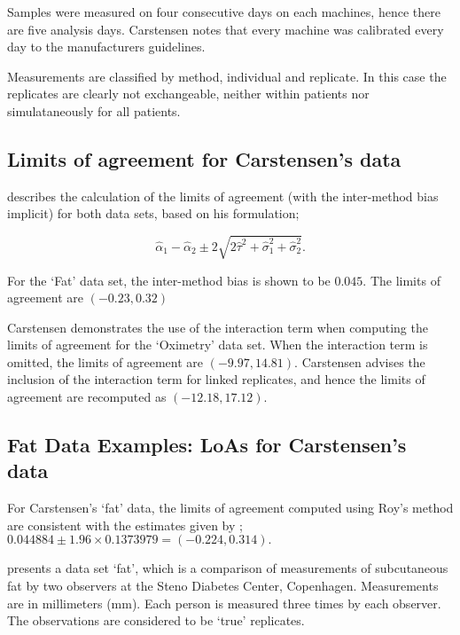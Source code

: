 \documentclass[12pt, a4paper]{report}
\theoremstyle{plain}
\theoremstyle{definition}
\theoremstyle{remark}
\begin{document}
	Samples were measured on four consecutive days on each machines, hence there are five analysis days. Carstensen notes that every machine was calibrated every day to  the manufacturers guidelines.

	Measurements are classified by method, individual and replicate. In this case the replicates are clearly not exchangeable, neither within patients nor simulataneously for all patients.

	\subsection{Limits of agreement for Carstensen's data}
	
	
	\citet{bxc2008} describes the calculation of the limits of agreement (with the inter-method bias implicit) for both data sets, based on his formulation;
	
	\[\hat{\alpha}_1 - \hat{\alpha}_2 \pm 2\sqrt{2\hat{\tau}^2 +\hat{\sigma}_1^2 +\hat{\sigma}_2^2 }.\]
	
	For the `Fat' data set, the inter-method bias is shown to be $0.045$. The limits of agreement are $(-0.23 , 0.32)$
	
	Carstensen demonstrates the use of the interaction term when computing the limits of agreement for the `Oximetry' data set. When the interaction term is omitted, the limits of agreement are $(-9.97, 14.81)$. Carstensen advises the inclusion of the interaction term for linked replicates, and hence the limits of agreement are recomputed as $(-12.18,17.12)$.
	
		
	\subsection{Fat Data Examples: LoAs for Carstensen's data}
	
		
		For Carstensen's `fat' data, the limits of agreement computed using Roy's
		method are consistent with the estimates given by \citet{BXC2008}; $0.044884  \pm 1.96 \times  0.1373979 = (-0.224,  0.314).$
		

		
		
		
		
	\citet{BXC2008} presents a data set `fat', which is a comparison of measurements of subcutaneous fat
	by two observers at the Steno Diabetes Center, Copenhagen. Measurements are in millimeters
	(mm). Each person is measured three times by each observer. The observations are considered to be `true' replicates.
	
\end{document}
